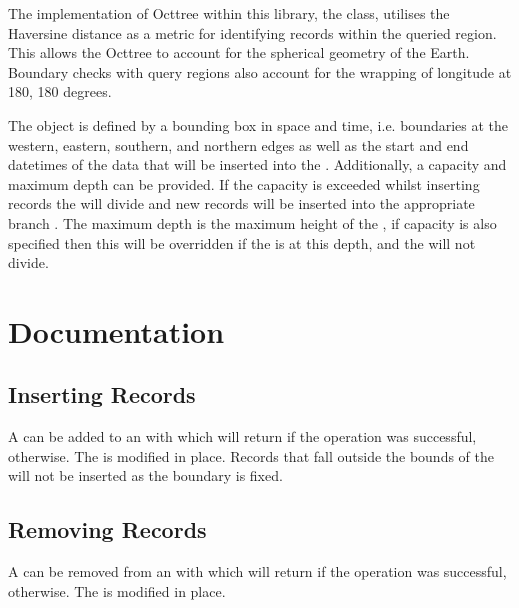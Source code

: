 \documentclass[letterpaper,10pt,english]{sphinxmanual}
\begin{document}
\sphinxAtStartPar
The implementation of Octtree within this library, the  class, utilises the Haversine distance as a metric
for identifying records within the queried region. This allows the Octtree to account for the spherical geometry of the
Earth. Boundary checks with query regions also account for the wrapping of longitude at \sphinxhyphen{}180, 180 degrees.

\sphinxAtStartPar
The  object is defined by a bounding box in space and time, i.e. boundaries at the western, eastern,
southern, and northern edges as well as the start and end datetimes of the data that will be inserted into the .
Additionally, a capacity and maximum depth can be provided. If the capacity is exceeded whilst inserting records the
 will divide and new records will be inserted into the appropriate branch . The maximum depth is the
maximum height of the , if capacity is also specified then this will be overridden if the  is at this
depth, and the  will not divide.


\section{Documentation}
\label{\detokenize{octtree:documentation}}

\subsection{Inserting Records}
\label{\detokenize{octtree:inserting-records}}
\sphinxAtStartPar
A  can be added to an  with  which will return  if the operation
was successful,  otherwise. The  is modified in place. Records that fall outside the bounds of the
 will not be inserted as the boundary is fixed.


\subsection{Removing Records}
\label{\detokenize{octtree:removing-records}}
\sphinxAtStartPar
A  can be removed from an  with  which will return  if the operation
was successful,  otherwise. The  is modified in place.
\end{document}
